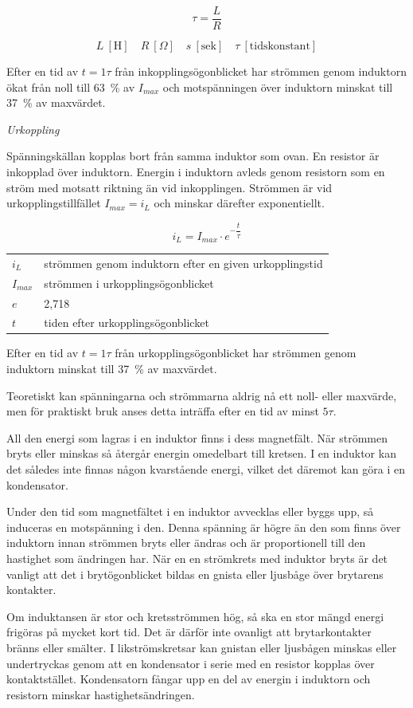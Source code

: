 \[\tau = \frac{L}{R}\]

\[
L\ [\text{H}] \quad
R\ [Ω] \quad
s\ [\text{sek}] \quad
\tau\ [\text{tidskonstant}]
\]

Efter en tid av \(t = 1\tau\) från inkopplingsögonblicket har strömmen genom
induktorn ökat från noll till 63~\% av \(I_{max}\) och motspänningen över
induktorn minskat till 37~\% av maxvärdet.

\emph{Urkoppling}

Spänningskällan kopplas bort från samma induktor som ovan. En resistor är
inkopplad över induktorn. Energin i induktorn avleds genom resistorn som en
ström med motsatt riktning än vid inkopplingen. Strömmen är vid
urkopplingstillfället \(I_{max} = i_L\) och minskar därefter exponentiellt.

\[i_L = I_{max} \cdot e^{-\dfrac{t}{\tau}}\]

\begin{tabular}{ll}
  \(i_L\) & strömmen genom induktorn efter en given urkopplingstid \\
  \(I_{max}\) & strömmen i urkopplingsögonblicket \\
  \(e\) & 2,718 \\
  \(t\) & tiden efter urkopplingsögonblicket \\
\end{tabular}

Efter en tid av \(t = 1\tau\) från urkopplingsögonblicket har strömmen genom
induktorn minskat till 37~\% av maxvärdet.

Teoretiskt kan spänningarna och strömmarna aldrig nå ett noll- eller maxvärde,
men för praktiskt bruk anses detta inträffa efter en tid av minst \(5\tau\).

All den energi som lagras i en induktor finns i dess magnetfält. När strömmen
bryts eller minskas så återgår energin omedelbart till kretsen. I en induktor
kan det således inte finnas någon kvarstående energi, vilket det däremot kan
göra i en kondensator.

Under den tid som magnetfältet i en induktor avvecklas eller byggs upp, så
induceras en motspänning i den. Denna spänning är högre än den som finns över
induktorn innan strömmen bryts eller ändras och är proportionell till den
hastighet som ändringen har. När en en strömkrets med induktor
bryts är det vanligt att det i brytögonblicket bildas en gnista eller ljusbåge
över brytarens kontakter.

Om induktansen är stor och kretsströmmen hög, så ska en stor mängd energi
frigöras på mycket kort tid. Det är därför inte ovanligt att brytarkontakter
bränns eller smälter. I likströmskretsar kan gnistan eller ljusbågen minskas
eller undertryckas genom att en kondensator i serie med en resistor kopplas
över kontaktstället. Kondensatorn fångar upp en del av energin i induktorn och
resistorn minskar hastighetsändringen.

